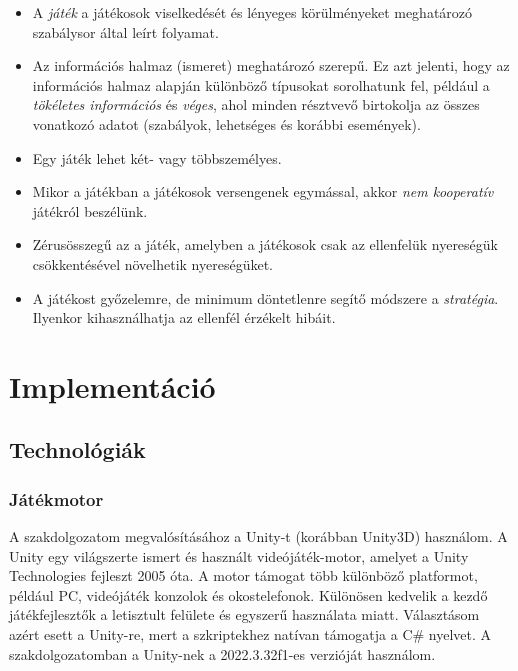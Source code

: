 \documentclass[
]{thesis-ekf}
\theoremstyle{definition}
\theoremstyle{remark}
\begin{document}
\begin{itemize}
	\item A \emph{játék} a játékosok viselkedését és lényeges körülményeket meghatározó szabálysor által leírt folyamat.
	\item Az információs halmaz (ismeret) meghatározó szerepű. Ez azt jelenti, hogy az információs halmaz alapján különböző típusokat sorolhatunk fel, például a \emph{tökéletes információs} és \emph{véges}, ahol minden résztvevő birtokolja az összes vonatkozó adatot (szabályok, lehetséges és korábbi események).
	\item Egy játék lehet két- vagy többszemélyes.
	\item Mikor a játékban a játékosok versengenek egymással, akkor \emph{nem kooperatív} játékról beszélünk.
	\item Zérusösszegű az a játék, amelyben a játékosok csak az ellenfelük nyereségük csökkentésével növelhetik nyereségüket.
	\item A játékost győzelemre, de minimum döntetlenre segítő módszere a \emph{stratégia}. Ilyenkor kihasználhatja az ellenfél érzékelt hibáit.
\end{itemize} 

\chapter{Implementáció}

\section{Technológiák}

\subsection{Játékmotor}

A szakdolgozatom megvalósításához a Unity-t (korábban Unity3D) használom. A Unity egy világszerte ismert és használt videójáték-motor, amelyet a Unity Technologies fejleszt 2005 óta. A motor támogat több különböző platformot, például PC, videójáték konzolok és okostelefonok. Különösen kedvelik a kezdő játékfejlesztők a letisztult felülete és egyszerű használata miatt. Választásom azért esett a Unity-re, mert a szkriptekhez natívan támogatja a C\# nyelvet. A szakdolgozatomban a Unity-nek a 2022.3.32f1-es verzióját használom.
\end{document}
